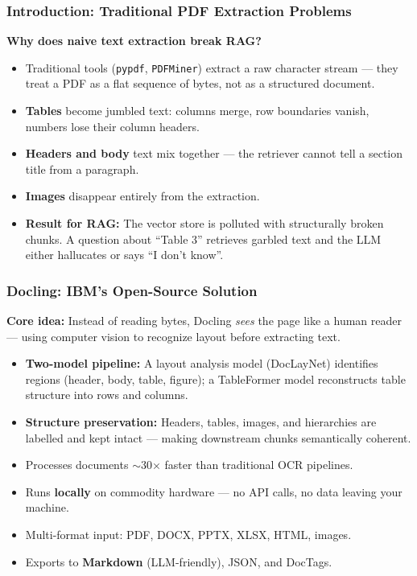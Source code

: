 \begin{frame}[fragile]\frametitle{Introduction: Traditional PDF Extraction Problems}

\textbf{Why does naive text extraction break RAG?}

      \begin{itemize}
        \item Traditional tools (\texttt{pypdf}, \texttt{PDFMiner}) extract a raw character stream --- they treat a PDF as a flat sequence of bytes, not as a structured document.
        \item \textbf{Tables} become jumbled text: columns merge, row boundaries vanish, numbers lose their column headers.
        \item \textbf{Headers and body} text mix together --- the retriever cannot tell a section title from a paragraph.
        \item \textbf{Images} disappear entirely from the extraction.
        \item \textbf{Result for RAG:} The vector store is polluted with structurally broken chunks. A question about ``Table 3'' retrieves garbled text and the LLM either hallucates or says ``I don't know''.
      \end{itemize}
\end{frame}

\begin{frame}[fragile]\frametitle{Docling: IBM's Open-Source Solution}

\textbf{Core idea:} Instead of reading bytes, Docling \textit{sees} the page like a human reader --- using computer vision to recognize layout before extracting text.

      \begin{itemize}
        \item \textbf{Two-model pipeline:} A layout analysis model (DocLayNet) identifies regions (header, body, table, figure); a TableFormer model reconstructs table structure into rows and columns.
        \item \textbf{Structure preservation:} Headers, tables, images, and hierarchies are labelled and kept intact --- making downstream chunks semantically coherent.
        \item Processes documents $\sim$30$\times$ faster than traditional OCR pipelines.
        \item Runs \textbf{locally} on commodity hardware --- no API calls, no data leaving your machine.
        \item Multi-format input: PDF, DOCX, PPTX, XLSX, HTML, images.
        \item Exports to \textbf{Markdown} (LLM-friendly), JSON, and DocTags.
      \end{itemize}
\end{frame}


